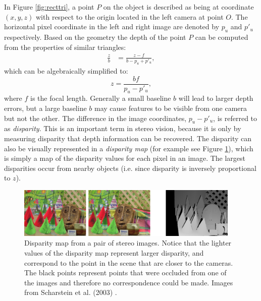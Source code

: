 In Figure \ref{fig:recttri}, a point $P$ on the object is described as being at coordinate $(x,y,z)$ with respect to the origin located in the left camera at point $O$. The horizontal pixel coordinate in the left and right image are denoted by $p_u$ and $p'_u$ respectively. Based on the geometry the depth of the point $P$ can be computed from the properties of similar triangles:
\begin{align}
  \frac{z}{b} &= \frac{z-f}{b-p_u+p'_u},
\end{align}
which can be algebraically simplified to:
\begin{equation}
    z = \frac{bf}{p_u-p'_u},
\end{equation}
where $f$ is the focal length. Generally a small baseline $b$ will lead to larger depth errors, but a large baseline $b$ may cause features to be visible from one camera but not the other. The difference in the image coordinates, $p_u-p'_u$, is referred to as \textit{disparity}. This is an important term in stereo vision, because it is only by measuring disparity that depth information can be recovered. The disparity can also be visually represented in a \textit{disparity map} (for example see Figure \ref{fig:disparity}), which is simply a map of the disparity values for each pixel in an image. The largest disparities occur from nearby objects (i.e. since disparity is inversely proportional to $z$).
\begin{figure}[ht]
\centering
\includegraphics[width=0.95\textwidth]{tex/figs/ch09_figs/disparitymap.png}
\caption{Disparity map from a pair of stereo images. Notice that the lighter values of the disparity map represent larger disparity, and correspond to the point in the scene that are closer to the cameras. The black points represent points that were occluded from one of the images and therefore no correspondence could be made. Images from Scharstein et al. (2003) \nocite{ScharsteinSzeliski2003}.}
\label{fig:disparity}
\end{figure}

